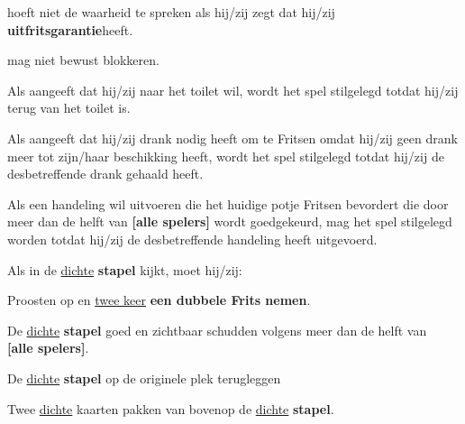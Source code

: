 \vervolgLijst{}
    \item \EenSpeler hoeft niet de waarheid te spreken als hij/zij zegt dat hij/zij \textbf{uitfritsgarantie}\footnotemark[2] heeft.
\eindLijst{}   

\vervolgLijst{}
    \item \EenSpeler mag \medeSpelers niet bewust blokkeren. 
\eindLijst{}   


\newpage
{}


\vervolgLijst{}
    \item Als \eenSpeler aangeeft dat hij/zij naar het toilet wil, wordt het spel stilgelegd totdat hij/zij terug van het toilet is.
    \label{regel:stilleggen_1}
\eindLijst{}   

\vervolgLijst{}
    \item Als \eenSpeler aangeeft dat hij/zij drank nodig heeft om te Fritsen omdat hij/zij geen drank meer tot zijn/haar beschikking heeft, wordt het spel stilgelegd totdat hij/zij de desbetreffende drank gehaald heeft.
    \label{regel:stilleggen_2}
\eindLijst{}   

\vervolgLijst{}
    \item Als \eenSpeler een handeling wil uitvoeren die het huidige potje Fritsen bevordert die door meer dan de helft van \textbf{[alle spelers]} wordt goedgekeurd, mag het spel stilgelegd worden totdat hij/zij de desbetreffende handeling heeft uitgevoerd.
    \label{regel:stilleggen_3}
\eindLijst{}  


\vervolgLijst{}
    \item Als \eenSpeler in de \ul{dichte} \textbf{stapel} kijkt, moet hij/zij:
    \puntLijst{}
        \item Proosten op  en \ul{twee keer} \textbf{een dubbele Frits nemen}\footnotemark[2]. 
        \item De \ul{dichte} \textbf{stapel} goed en zichtbaar schudden volgens meer dan de helft van \\ \textbf{[alle spelers]}.
        \item De \ul{dichte} \textbf{stapel} op de originele plek terugleggen
        \item Twee \ul{dichte} kaarten pakken van bovenop de \ul{dichte} \textbf{stapel}.
    \eindPuntLijst{}
    \label{regel:kijken_in_dichte_stapel}
\eindLijst{}  

